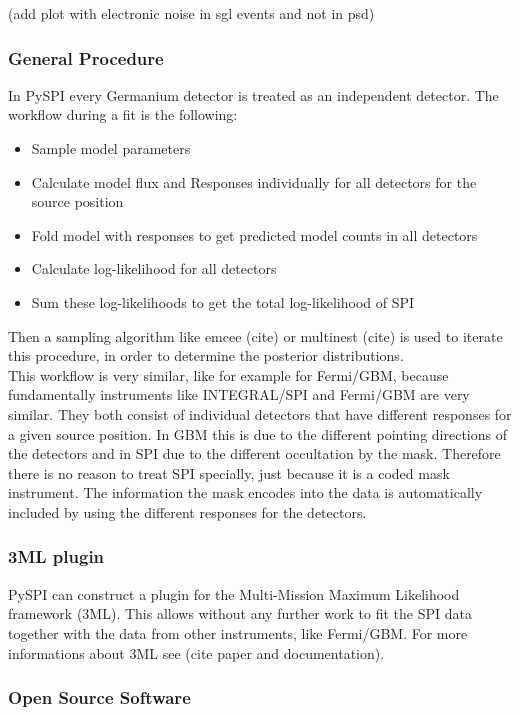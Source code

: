 \documentclass[twocolumn]{article}%
\begin{document}
(add plot with electronic noise in sgl events and not in psd)

\subsubsection*{General Procedure}

In PySPI every Germanium detector is treated as an independent detector. The workflow during a fit is the following:
\begin{itemize}
  \item Sample model parameters
  \item Calculate model flux and Responses individually for all detectors for the source position
  \item Fold model with responses to get predicted model counts in all detectors
  \item Calculate log-likelihood for all detectors
  \item Sum these log-likelihoods to get the total log-likelihood of SPI
\end{itemize}
Then a sampling algorithm like emcee (cite) or multinest (cite) is used to iterate this procedure, in order to determine the posterior distributions.\\
This workflow is very similar, like for example for Fermi/GBM, because fundamentally instruments like INTEGRAL/SPI and Fermi/GBM are very similar. They both consist of individual detectors that have different responses for a given source position. In GBM this is due to the different pointing directions of the detectors and in SPI due to the different occultation by the mask. Therefore there is no reason to treat SPI specially, just because it is a coded mask instrument. The information the mask encodes into the data is automatically included by using the different responses for the detectors.

\subsubsection*{3ML plugin}

PySPI can construct a plugin for the Multi-Mission Maximum Likelihood framework (3ML). This allows without any further work to fit the SPI data together with the data from other instruments, like Fermi/GBM. For more informations about 3ML see (cite paper and documentation).

\subsubsection*{Open Source Software}
\end{document}

